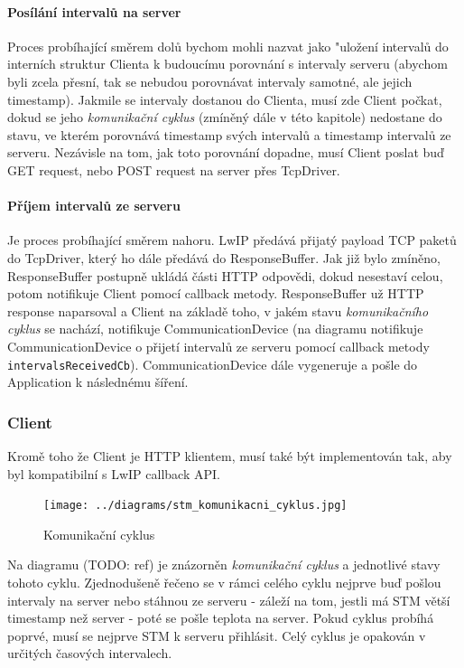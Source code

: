 \paragraph{Posílání intervalů na server}
Proces probíhající směrem dolů bychom mohli nazvat jako "uložení intervalů do interních
struktur Clienta k budoucímu porovnání s intervaly serveru (abychom byli zcela přesní, tak se
nebudou porovnávat intervaly samotné, ale jejich timestamp).
Jakmile se intervaly dostanou do Clienta, musí zde Client počkat, dokud se jeho \emph{komunikační cyklus}
(zmíněný dále v této kapitole) nedostane do stavu, ve kterém porovnává timestamp svých intervalů
a timestamp intervalů ze serveru.
Nezávisle na tom, jak toto porovnání dopadne, musí Client poslat buď GET request, nebo POST request
na server přes TcpDriver.

\paragraph{Příjem intervalů ze serveru}
Je proces probíhající směrem nahoru.
LwIP předává přijatý payload TCP paketů do TcpDriver, který ho dále předává do ResponseBuffer.
Jak již bylo zmíněno, ResponseBuffer postupně ukládá části HTTP odpovědi, dokud nesestaví celou,
potom notifikuje Client pomocí callback metody.
ResponseBuffer už HTTP response naparsoval a Client na základě toho, v jakém stavu \emph{komunikačního cyklus}
se nachází, notifikuje CommunicationDevice (na diagramu notifikuje CommunicationDevice o přijetí
intervalů ze serveru pomocí callback metody \texttt{intervalsReceivedCb}).
CommunicationDevice dále vygeneruje  a pošle do Application
k následnému šíření.

\subsubsection{Client}
Kromě toho že Client je HTTP klientem, musí také být implementován tak, aby byl kompatibilní s LwIP
callback API.

\begin{figure}[tbh]\centering
\texttt{[image: ../diagrams/stm\_komunikacni\_cyklus.jpg]}
\caption{Komunikační cyklus}
\label{stm-komunikacni-cyklus}
\end{figure}

Na diagramu (TODO: ref) je znázorněn \emph{komunikační cyklus} a jednotlivé stavy tohoto cyklu.
Zjednodušeně řečeno se v rámci celého cyklu nejprve buď pošlou intervaly na server nebo stáhnou ze
serveru - záleží na tom, jestli má STM větší timestamp než server - poté se pošle teplota na server.
Pokud cyklus probíhá poprvé, musí se nejprve STM k serveru přihlásit.
Celý cyklus je opakován v určitých časových intervalech.

